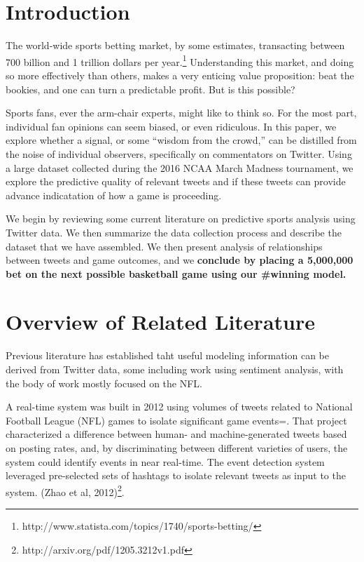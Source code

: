\documentclass[12pt]{article}
\begin{document}
\tableofcontents
\newpage
\begin{doublespacing}

\section{Introduction}

The world-wide sports betting market, by some estimates, transacting between 700 billion and 1 trillion dollars per year.\footnote{http://www.statista.com/topics/1740/sports-betting/}
Understanding this market, and doing so more effectively
than others, makes a very enticing value proposition:
beat the bookies, and one can turn a predictable profit. But is this possible? 

Sports fans, ever the arm-chair experts, might like to think so.
For the most part, individual fan opinions can seem biased, or even ridiculous.
In this paper, we explore whether a signal, or some ``wisdom from the crowd,'' can be distilled
from the noise of individual observers, specifically on commentators on Twitter. Using
a large dataset collected during the 2016 NCAA March Madness tournament, 
we explore the predictive quality of relevant tweets and if these tweets can provide advance
indicatation of how a game is proceeding.

We begin by reviewing some current literature on predictive sports analysis using Twitter data.
We then summarize the data collection process and describe the dataset that we have assembled. 
We then present analysis of relationships between tweets and game outcomes, and we {\bf conclude
by placing a 5,000,000 bet on the next possible basketball game using our \#winning model.}

\section{Overview of Related Literature}

Previous literature has established taht useful modeling information can be
derived from Twitter data, some including work using sentiment analysis, with the body of work mostly focused on the NFL. 

A real-time system was built in 2012 using volumes of 
tweets related to National Football League (NFL) games to 
isolate significant game
events=. That project characterized a 
difference between human- and machine-generated tweets
based on posting rates, and, by discriminating between 
different varieties of users, the system could 
identify events in near real-time. The event detection
system leveraged pre-selected sets of hashtags
to isolate relevant tweets as input to the system. (Zhao et al, 
2012)\footnote{http://arxiv.org/pdf/1205.3212v1.pdf}. 


\end{doublespacing}
\end{document}
